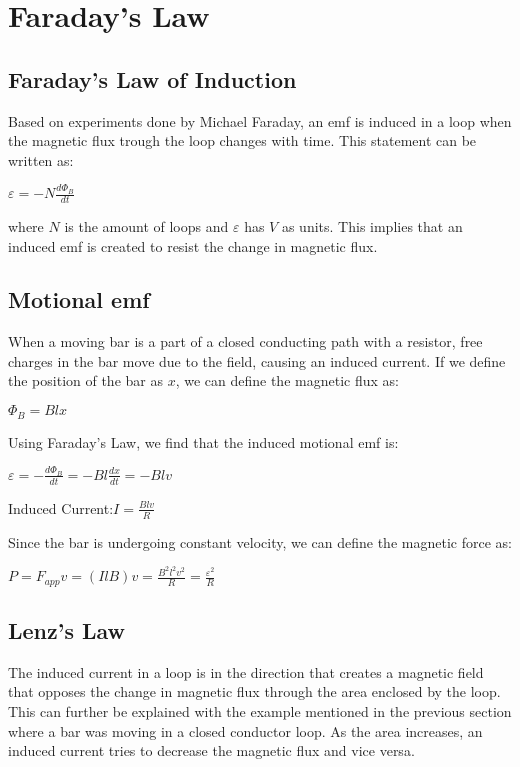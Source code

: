 \documentclass[12pt]{report}
\begin{document}
\chapter{Faraday's Law}
	\section{Faraday's Law of Induction}
		Based on experiments done by Michael Faraday, an emf is induced in a loop when the magnetic flux trough the loop changes with time. This statement can be written as:\\
		\centerline{$\varepsilon = -N\frac{d\Phi_B}{dt}$}
		where $N$ is the amount of loops and $\varepsilon$ has $V$ as units. This implies that an induced emf is created to resist the change in magnetic flux.
	\section{Motional emf}
		When a moving bar is a part of a closed conducting path with a resistor, free charges in the bar move due to the field, causing an induced current. If we define the position of the bar as $x$, we can define the magnetic flux as:\\
		\centerline{$\Phi_B = Blx$}
		Using Faraday's Law, we find that the induced motional emf is:\\
		\centerline{$\varepsilon = -\frac{d\Phi_B}{dt} = -Bl\frac{dx}{dt} = -Blv$}
		\centerline{Induced Current:$I = \frac{Blv}{R}$}
		Since the bar is undergoing constant velocity, we can define the magnetic force as:\\
		\centerline{$P = F_{app}v = (IlB)v = \frac{B^2l^2v^2}{R} = \frac{\varepsilon^2}{R}$}
	\section{Lenz's Law}
		The induced current in a loop is in the direction that creates a magnetic field that opposes the change in magnetic flux through the area enclosed by the loop.\\
		This can further be explained with the example mentioned in the previous section where a bar was moving in a closed conductor loop. As the area increases, an induced current tries to decrease the magnetic flux and vice versa.
\end{document}
